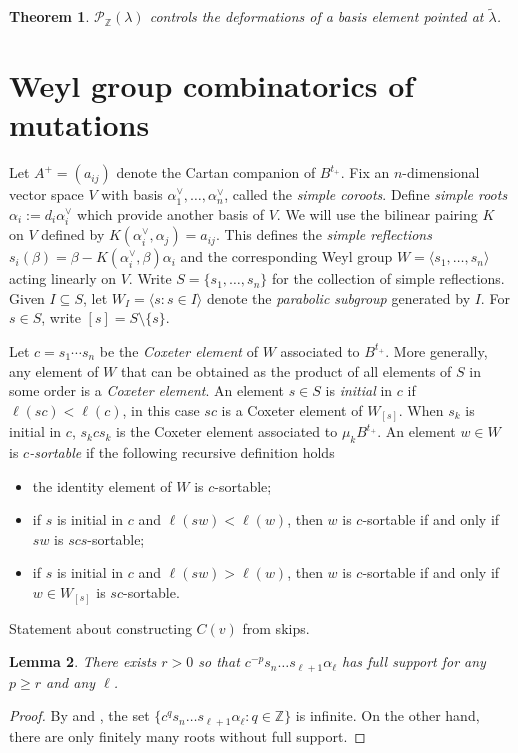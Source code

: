 \documentclass{amsart}
\newtheorem{theorem}{Theorem}
\newtheorem{lemma}[theorem]{Lemma}
\numberwithin{theorem}{section}
\newcommand{\cP}{\mathcal{P}}
\newcommand{\ZZ}{\mathbb{Z}}
\begin{document}
  \begin{theorem}
    \cite{qin}
    $\cP_\ZZ(\lambda)$ controls the deformations of a basis element pointed at $\widetilde\lambda$.
  \end{theorem}


  \section{Weyl group combinatorics of mutations}
  Let $A^+=(a_{ij})$ denote the Cartan companion of $B^{t_+}$.
  Fix an $n$-dimensional vector space $V$ with basis $\alpha^\vee_1,\ldots,\alpha^\vee_n$, called the \emph{simple coroots}.
  Define \emph{simple roots} $\alpha_i:=d_i\alpha^\vee_i$ which provide another basis of $V$.
  We will use the bilinear pairing $K$ on $V$ defined by $K(\alpha^\vee_i,\alpha_j)=a_{ij}$.
  This defines the \emph{simple reflections} $s_i(\beta)=\beta-K(\alpha^\vee_i,\beta)\alpha_i$ and the corresponding Weyl group $W=\langle s_1,\ldots,s_n\rangle$ acting linearly on $V$.
  Write $S=\{s_1,\ldots,s_n\}$ for the collection of simple reflections.
  Given $I\subseteq S$, let $W_I=\langle s:s\in I\rangle$ denote the \emph{parabolic subgroup} generated by $I$.
  For $s\in S$, write $[s]=S\setminus\{s\}$.

  Let $c=s_1\cdots s_n$ be the \emph{Coxeter element} of $W$ associated to $B^{t_+}$.
  More generally, any element of $W$ that can be obtained as the product of all elements of $S$ in some order is a \emph{Coxeter element}.
  An element $s\in S$ is \emph{initial} in $c$ if $\ell(sc)<\ell(c)$, in this case $sc$ is a Coxeter element of $W_{[s]}$.
  When $s_k$ is initial in $c$, $s_k c s_k$ is the Coxeter element associated to $\mu_k B^{t_+}$.
  An element $w\in W$ is \emph{$c$-sortable} if the following recursive definition holds
  \begin{itemize}
    \item the identity element of $W$ is $c$-sortable;
    \item if $s$ is initial in $c$ and $\ell(sw)<\ell(w)$, then $w$ is $c$-sortable if and only if $sw$ is $scs$-sortable;
    \item if $s$ is initial in $c$ and $\ell(sw)>\ell(w)$, then $w$ is $c$-sortable if and only if $w\in W_{[s]}$ is $sc$-sortable.
  \end{itemize}

  Statement about constructing $C(v)$ from skips.

  \begin{lemma}
    \label{le:coxeter power}
    There exists $r>0$ so that $c^{-p} s_n \ldots s_{\ell+1} \alpha_\ell$ has full support for any $p\ge r$ and any $\ell$.
  \end{lemma}
  \begin{proof}
    By \cite[Theorem 1.2(1)]{Reading-Stella} and \cite[Section 1]{Dlab-Ringel}, the set $\{c^q s_n \ldots s_{\ell+1} \alpha_\ell:q\in\ZZ\}$ is infinite.
    On the other hand, there are only finitely many roots without full support.
  \end{proof}
  
\end{document}
